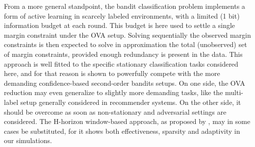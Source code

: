 \documentclass[preprint,12pt,authoryear]{elsarticle}
\begin{document}
From a more general standpoint, the bandit classification problem implements a form of active learning in scarcely labeled environments, with a limited (1 bit) information budget at each round. This budget is here used to settle a single margin constraint under the OVA setup. Solving sequentially the observed margin constraints is then expected to solve in approximation the total (unobserved) set of margin constraints, provided enough redundancy is present in the data. This approach is well fitted to the specific stationary classification tasks considered here, and for that reason is shown to powerfully compete with the more demanding confidence-based second-order bandits setups. On one side, the OVA reduction may even generalize to slightly more demanding tasks, like the multi-label setup generally considered in recommender systems. On the other side, it should be overcome as soon as non-stationary and adversarial settings are considered.
The H-horizon window-based approach, as proposed by \cite{kivinen2004online}, may in some cases be substituted, for it  shows both effectiveness, sparsity and adaptivity in our simulations.  
    
\end{document}
